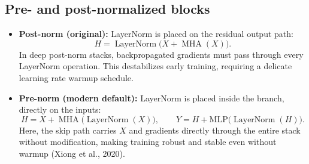 \documentclass[11pt,a4paper]{article}
\DeclareMathOperator{\LN}{LayerNorm}
\DeclareMathOperator{\MHA}{MHA}
\newcommand{\slides}[1]{\par\nopagebreak\noindent{\normalfont\small\emph{(slides #1)}}\par\nopagebreak\vspace{2pt}}
\theoremstyle{definition}
\theoremstyle{plain}
\begin{document}
\subsection{Pre- and post-normalized blocks}\slides{43 / 84}
\begin{itemize}
\item \textbf{Post-norm (original):} LayerNorm is placed on the residual output path:
\begin{equation}
H = \LN\big(X + \MHA(X)\big).
\end{equation}
In deep post-norm stacks, backpropagated gradients must pass through every LayerNorm operation. This destabilizes early training, requiring a delicate learning rate warmup schedule.
\item \textbf{Pre-norm (modern default):} LayerNorm is placed inside the branch, directly on the inputs:
\begin{equation}
H = X + \MHA\big(\LN(X)\big), \qquad Y = H + \mathrm{MLP}\big(\LN(H)\big).
\end{equation}
Here, the skip path carries $X$ and gradients directly through the entire stack without modification, making training robust and stable even without warmup (Xiong et al., 2020).
\end{itemize}
\end{document}
